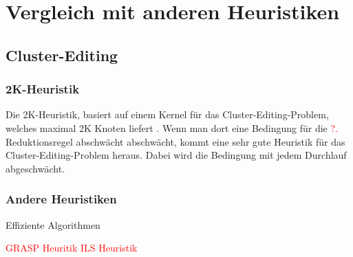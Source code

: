 \documentclass[12pt,a4paper,onecolumn,oneside,titlepage]{article}
\let\oldReturn\Return
\renewcommand{\Return}{\State\oldReturn}
\newcommand\todo[1]{\textcolor{red}{#1}}
\begin{document}
\section{Vergleich mit anderen Heuristiken}
\subsection{Cluster-Editing}
\subsubsection{2K-Heuristik}
Die 2K-Heuristik, basiert auf einem Kernel für das Cluster-Editing-Problem, welches maximal 2K Knoten liefert \cite{Chen12}. Wenn man dort eine Bedingung für die \todo{?.} Reduktionsregel abschwächt  abschwächt, kommt eine sehr gute Heuristik für das Cluster-Editing-Problem heraus. Dabei wird die Bedingung mit jedem Durchlauf abgeschwächt.
\pagebreak
\begin{center}
  \label{algo:2k}
\begin{algorithmic}[1]
			\EndFor
		\EndIf
	\EndFor
\EndWhile

\EndFunction

	\EndFor

\EndFunction
{}
	\EndFor

\EndFunction
\end{algorithmic}
\end{center}


\subsubsection{Andere Heuristiken}
\cite{Bastos2014} Effiziente Algorithmen

 \todo{GRASP Heuritik}
 \todo{ILS Heuristik}
\end{document}
